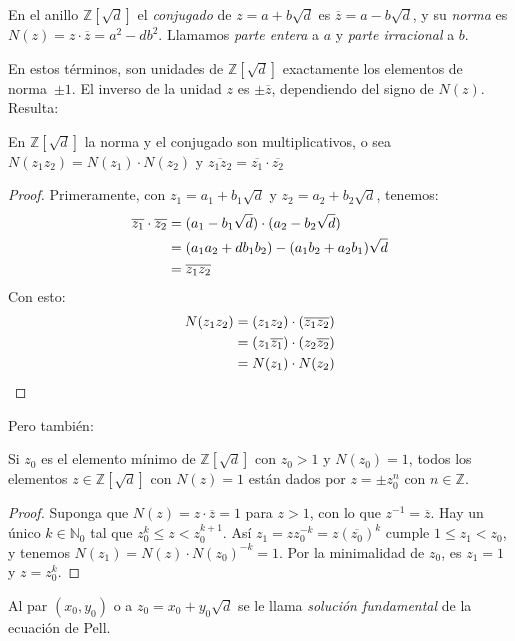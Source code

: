   \begin{definition}
    En el anillo \(\mathbb{Z}[\sqrt{d}]\)
    el \emph{conjugado} de \(z = a + b \sqrt{d}\)
    es \(\overline{z} = a - b \sqrt{d}\),
    y su \emph{norma} es \(N(z) = z \cdot \overline{z} = a^2 - d b^2\).
    Llamamos \emph{parte entera} a \(a\)
    y \emph{parte irracional} a \(b\).
  \end{definition}
  En estos términos,
  son unidades de \(\mathbb{Z}[\sqrt{d}]\)
  exactamente los elementos de norma~\(\pm 1\).
  El inverso de la unidad \(z\) es \(\pm \overline{z}\),
  dependiendo del signo de \(N(z)\).
  Resulta:
  \begin{theorem}
    En \(\mathbb{Z}[\sqrt{d}]\)
    la norma y el conjugado son multiplicativos,
    o sea \(N(z_1 z_2) = N(z_1) \cdot N(z_2)\)
    y \(\overline{z_1 z_2} = \overline{z_1} \cdot \overline{z_2}\)
  \end{theorem}
  \begin{proof}
    Primeramente,
    con \(z_1 = a_1 + b_1 \sqrt{d}\) y \(z_2 = a_2 + b_2 \sqrt{d}\),
    tenemos:
    \begin{align}
      \overline{z_1} \cdot \overline{z_2}
	&= (a_1 - b_1 \sqrt{d}) \cdot (a_2 - b_2 \sqrt{d}) \notag \\
	&= (a_1 a_2 + d b_1 b_2) - (a_1 b_2 + a_2 b_1) \sqrt{d} \notag \\
	&= \overline{z_1 z_2} \label{eq:conjugado-producto}
    \end{align}
    Con esto:
    \begin{align}
      N(z_1 z_2)
	&= (z_1 z_2) \cdot (\overline{z_1 z_2}) \notag \\
	&= (z_1 \overline{z_1}) \cdot (z_2 \overline{z_2}) \notag \\
	&= N(z_1) \cdot N(z_2) \label{eq:norma-producto}
	\qedhere
    \end{align}
  \end{proof}
  Pero también:
  \begin{theorem}
    Si \(z_0\) es el elemento mínimo de \(\mathbb{Z}[\sqrt{d}]\)
    con \(z_0 > 1\) y \(N(z_0) = 1\),
    todos los elementos \(z \in \mathbb{Z}[\sqrt{d}]\) con \(N(z) = 1\)
    están dados por \(z = \pm z_0^n\) con \(n \in \mathbb{Z}\).
  \end{theorem}
  \begin{proof}
    Suponga que \(N(z) = z \cdot \overline{z} = 1\) para \(z > 1\),
    con lo que \(z^{-1} = \overline{z}\).
    Hay un único \(k \in \mathbb{N}_0\)
    tal que \(z_0^k \le z < z_0^{k + 1}\).
    Así \(z_1 = z z_0^{-k} = z (\overline{z_0})^k\)
    cumple \(1 \le z_1 < z_0\),
    y tenemos \(N(z_1) = N(z) \cdot N(z_0)^{-k} = 1\).
    Por la minimalidad de \(z_0\),
    es \(z_1 = 1\)
    y \(z = z_0^k\).
  \end{proof}
  Al par \((x_0, y_0)\) o a \(z_0 = x_0 + y_0 \sqrt{d}\)
  se le llama \emph{solución fundamental} de la ecuación de Pell.%

